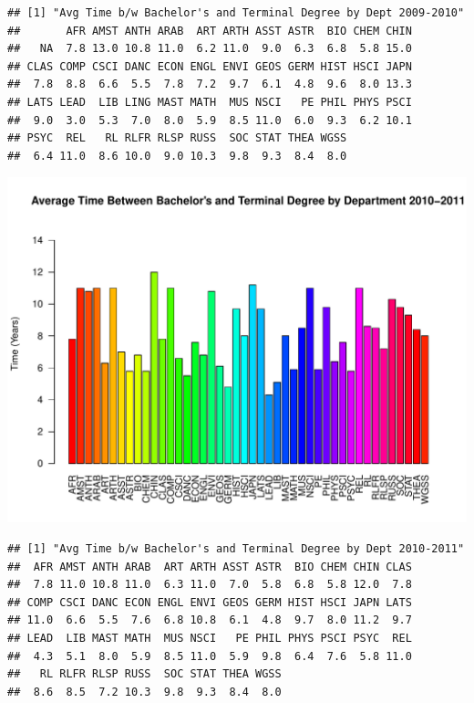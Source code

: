 \documentclass[12pt,a4paper]{article}\usepackage[]{graphicx}\usepackage[]{color}
\makeatletter
\def\maxwidth{ %
  \ifdim\Gin@nat@width>\linewidth
    \linewidth
  \else
    \Gin@nat@width
  \fi
}
\newenvironment{kframe}{%
 \def\at@end@of@kframe{}%
 \ifinner\ifhmode%
  \def\at@end@of@kframe{\end{minipage}}%
  \begin{minipage}{\columnwidth}%
 \fi\fi%
 \def\FrameCommand##1{\hskip\@totalleftmargin \hskip-\fboxsep
 \colorbox{shadecolor}{##1}\hskip-\fboxsep
     \hskip-\linewidth \hskip-\@totalleftmargin \hskip\columnwidth}%
 \MakeFramed {\advance\hsize-\width
   \@totalleftmargin\z@ \linewidth\hsize
   \@setminipage}}%
 {\par\unskip\endMakeFramed%
 \at@end@of@kframe}
\newenvironment{knitrout}{}{} %
\theoremstyle{definition}
\makeatother
\begin{document}
\begin{knitrout}
\begin{kframe}\begin{verbatim}
## [1] "Avg Time b/w Bachelor's and Terminal Degree by Dept 2009-2010"
##       AFR AMST ANTH ARAB  ART ARTH ASST ASTR  BIO CHEM CHIN 
##   NA  7.8 13.0 10.8 11.0  6.2 11.0  9.0  6.3  6.8  5.8 15.0 
## CLAS COMP CSCI DANC ECON ENGL ENVI GEOS GERM HIST HSCI JAPN 
##  7.8  8.8  6.6  5.5  7.8  7.2  9.7  6.1  4.8  9.6  8.0 13.3 
## LATS LEAD  LIB LING MAST MATH  MUS NSCI   PE PHIL PHYS PSCI 
##  9.0  3.0  5.3  7.0  8.0  5.9  8.5 11.0  6.0  9.3  6.2 10.1 
## PSYC  REL   RL RLFR RLSP RUSS  SOC STAT THEA WGSS 
##  6.4 11.0  8.6 10.0  9.0 10.3  9.8  9.3  8.4  8.0
\end{verbatim}
\end{kframe}
\includegraphics[width=\maxwidth]{figure/unnamed-chunk-12-7} 
\begin{kframe}\begin{verbatim}
## [1] "Avg Time b/w Bachelor's and Terminal Degree by Dept 2010-2011"
##  AFR AMST ANTH ARAB  ART ARTH ASST ASTR  BIO CHEM CHIN CLAS 
##  7.8 11.0 10.8 11.0  6.3 11.0  7.0  5.8  6.8  5.8 12.0  7.8 
## COMP CSCI DANC ECON ENGL ENVI GEOS GERM HIST HSCI JAPN LATS 
## 11.0  6.6  5.5  7.6  6.8 10.8  6.1  4.8  9.7  8.0 11.2  9.7 
## LEAD  LIB MAST MATH  MUS NSCI   PE PHIL PHYS PSCI PSYC  REL 
##  4.3  5.1  8.0  5.9  8.5 11.0  5.9  9.8  6.4  7.6  5.8 11.0 
##   RL RLFR RLSP RUSS  SOC STAT THEA WGSS 
##  8.6  8.5  7.2 10.3  9.8  9.3  8.4  8.0
\end{verbatim}
\end{kframe}

\end{knitrout}
\end{document}
